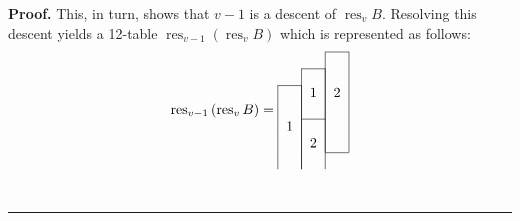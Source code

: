 \documentclass[numbers=enddot,12pt,final,onecolumn,notitlepage]{scrartcl}%
\theoremstyle{definition}
\newenvironment{proof}[1][Proof]{\noindent\textbf{#1.} }{\ \rule{0.5em}{0.5em}}
\begin{document}
\begin{proof}
This, in turn, shows that $v-1$ is a descent of $\operatorname*{res}%
\nolimits_{v}B$. Resolving this descent yields a 12-table $\operatorname*{res}\nolimits_{v-1}\left(
\operatorname*{res}\nolimits_{v}B\right)  $ which is represented as follows:%
\begin{equation}
\operatorname*{res}\nolimits_{v-1}\left(  \operatorname*{res}\nolimits_{v}%
B\right)  =%
\begin{tabular}{ccc}
\cline{3-3} & & \multicolumn{1}{|c|}{} \\
\cline{2-2} & \multicolumn{1}{|c|}{} & \multicolumn{1}{|c|}{} \\
\cline{1-1} \multicolumn{1}{|c|}{} & \multicolumn{1}{|c|}{1} & \multicolumn
{1}{|c|}{2} \\
\multicolumn{1}{|c|}{} & \multicolumn{1}{|c|}{} & \multicolumn{1}{|c|}{} \\
\cline{2-2} \multicolumn{1}{|c|}{1} & \multicolumn{1}{|c|}{} & \multicolumn
{1}{|c|}{} \\
\multicolumn{1}{|c|}{} & \multicolumn{1}{|c|}{2} & \multicolumn{1}{|c|}{} \\
\cline{3-3} \multicolumn{1}{|c|}{} & \multicolumn{1}{|c|}{} \\

\end{tabular}
\end{equation}
\end{proof}
\end{document}
